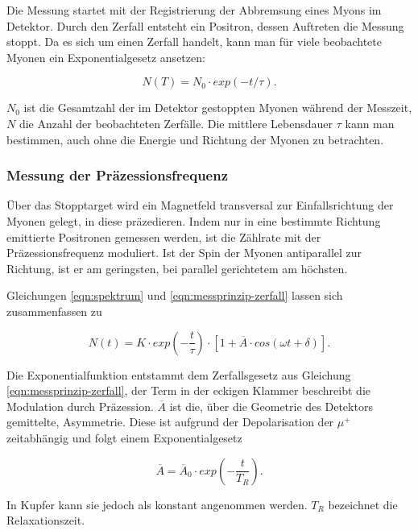 \documentclass[a4paper,ngerman]{scrartcl}
\begin{document}
Die Messung startet mit der Registrierung der Abbremsung eines Myons im Detektor. Durch den Zerfall entsteht ein Positron, dessen Auftreten die Messung stoppt. Da es sich um einen Zerfall handelt, kann man für viele beobachtete Myonen ein Exponentialgesetz ansetzen:

\begin{equation}
\label{eqn:messprinzip-zerfall}
N(T) = N_0 \cdot exp(-t / \tau) .
\end{equation} 
	
$N_0$ ist die Gesamtzahl der im Detektor gestoppten Myonen während der Messzeit, $N$ die Anzahl der beobachteten Zerfälle.
Die mittlere Lebensdauer $\tau$ kann man bestimmen, auch ohne die Energie und Richtung der Myonen zu betrachten. 

\subsubsection*{Messung der Präzessionsfrequenz}


Über das Stopptarget wird ein Magnetfeld transversal zur Einfallsrichtung der Myonen gelegt, in diese präzedieren.
Indem nur in eine bestimmte Richtung emittierte Positronen gemessen werden, ist die Zählrate mit der Präzessionsfrequenz moduliert. Ist der Spin der Myonen antiparallel zur Richtung, ist er am geringsten, bei parallel gerichtetem am höchsten.


Gleichungen \ref{eqn:spektrum} und \ref{eqn:messprinzip-zerfall}
lassen sich zusammenfassen zu

\begin{equation}
N(t) = K \cdot exp(- \frac{t}{\tau}) \cdot \left[ 1 + \overline{A} \cdot cos(\omega t + \delta) \right] .
\end{equation}

Die Exponentialfunktion entstammt dem Zerfallsgesetz aus Gleichung \ref{eqn:messprinzip-zerfall}, der Term in der eckigen Klammer beschreibt die Modulation durch Präzession.
$\overline{A}$ ist die, über die Geometrie des Detektors gemittelte, Asymmetrie. Diese ist aufgrund der Depolarisation der $\mu^{+}$ zeitabhängig und folgt einem Exponentialgesetz

\begin{equation}
\overline{A} = \overline{A}_0 \cdot exp(- \frac{t}{ T_R }) .
\end{equation}

In Kupfer kann sie jedoch als konstant angenommen werden. $T_R$ bezeichnet die Relaxationszeit.
	
\end{document}

